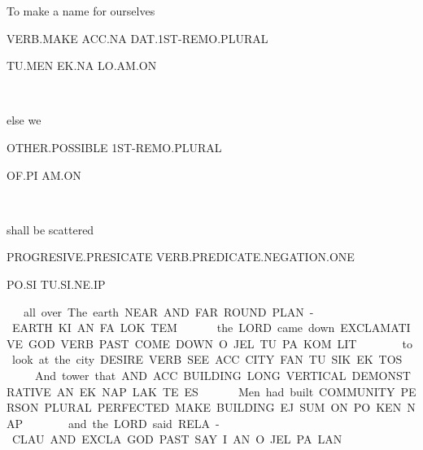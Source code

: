 {{  

To make 	a name 		for ourselves		 

VERB.MAKE	ACC.NA		DAT.1ST-REMO.PLURAL	 

TU.MEN	EK.NA		LO.AM.ON 

\tu\men~	\ek\na~		\lo\am\on 
\drie

 

else 			we 

OTHER.POSSIBLE	1ST-REMO.PLURAL 

OF.PI			AM.ON 

\of\Atlanpi ~ \am\on
\drie
 

shall be			    scattered			

PROGRESIVE.PRESICATE    VERB.PREDICATE.NEGATION.ONE        

PO.SI			     TU.SI.NE.IP		 

\po\si~\am\om
\drie 

all over			The earth 

NEAR.AND.FAR		ROUND.PLAN-EARTH 

KI.AN.FA		LOK.TEM 

\ki\an\fa ~ \lok\tem
\drie 
 

the LORD 		came down 			

EXCLAMATIVE.GOD         VERB.PAST.COME.DOWN		

O.JEL			TU.PA.KOM.LIT			 

\Atlano\jel ~ \tu\pa\kom\lit 
\drie 

to look			at the city 

DESIRE.VERB.SEE	ACC.CITY 

FAN.TU.SIK		EK.TOS 

\fan\tu\sik ~ \ek\tos
\drie 
  

And 	tower 				that 			 

AND	ACC.BUILDING.LONG.VERTICAL	DEMONSTRATIVE	 

AN	EK.NAP.LAK.TE			ES			 

\an~\ek\nap\lak\te ~\es
 

Men				had built 

COMMUNITY.PERSON.PLURAL	PERFECTED.MAKE.BUILDING 

EJ.SUM.ON			PO.KEN.NAP 

\ej\Atlansum\on ~ \po\ken\nap
  
\drie 

and 			the LORD            said 

RELA-CLAU.AND              EXCLA.GOD	PAST.SAY 

I.AN			O.JEL		PA.LAN 

}}
